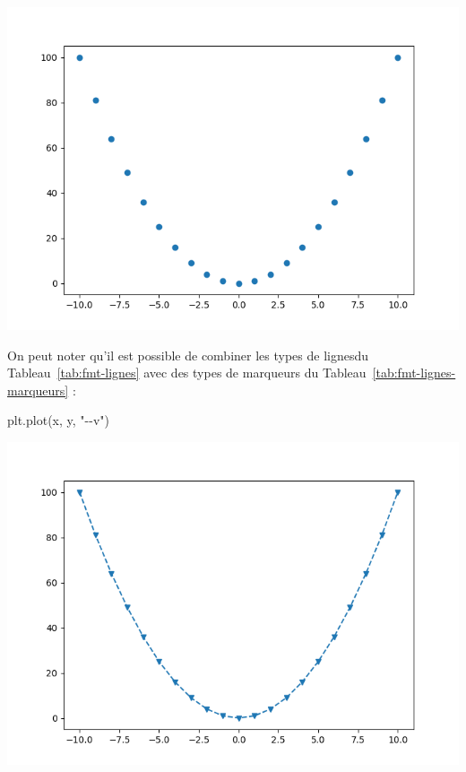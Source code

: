 \documentclass[
  12pt,
]{book}
\newenvironment{Shaded}{\begin{snugshade}}{\end{snugshade}}
\newcommand{\NormalTok}[1]{#1}
\newcommand{\StringTok}[1]{\textcolor[rgb]{0.31,0.60,0.02}{#1}}
\numberwithin{equation}{section}
\numberwithin{countremarque}{section}
\begin{document}
\begin{center}\includegraphics[width=9.03in]{figs/pyplot/lignes_cercles} \end{center}

On peut noter qu'il est possible de combiner les types de lignesdu Tableau~\ref{tab:fmt-lignes} avec des types de marqueurs du Tableau~\ref{tab:fmt-lignes-marqueurs} :

\begin{Shaded}
\begin{Highlighting}[]
\NormalTok{plt.plot(x, y, }\StringTok{"{-}{-}v"}\NormalTok{)}
\end{Highlighting}
\end{Shaded}

\begin{center}\includegraphics[width=9.03in]{figs/pyplot/lignes_tirets_triangles} \end{center}
\end{document}
